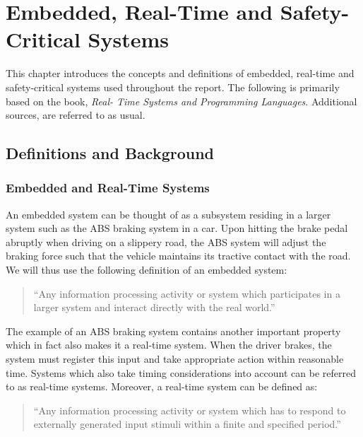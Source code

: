 \chapter{Embedded, Real-Time and Safety-Critical Systems}
\label{chapter:rts}
This chapter introduces the concepts and definitions of embedded, real-time and safety-critical systems used throughout the report. The following is primarily based on the book, \textit{Real- Time Systems and Programming Languages}\cite{alan2001real}. Additional sources, are referred to as usual.

\section{Definitions and Background} %
\label{sec:definitions_and_background}

\subsection{Embedded and Real-Time Systems} %
\label{sub:real_time_and_embedded_systems}
An embedded system can be thought of as a subsystem residing in a larger system such as the ABS braking system in a car. Upon hitting the brake pedal abruptly when driving on a slippery road, the ABS system will adjust the braking force such that the vehicle maintains its tractive contact with the road. We will thus use the following definition of an embedded system:

\begin{quotation}
``Any information processing activity or system which participates in a larger system and interact directly with the real world.''~\cite{alan2001real}
\end{quotation}

The example of an ABS braking system contains another important property which in fact also makes it a real-time system. When the driver brakes, the system must register this input and take appropriate action within reasonable time. Systems which also take timing considerations into account can be referred to as real-time systems. Moreover, a real-time system can be defined as:

\begin{quotation}
``Any information processing activity or system which has to respond to externally generated input stimuli within a finite and specified period.''~\cite{alan2001real}
\end{quotation}

